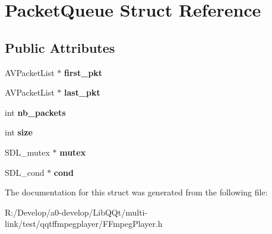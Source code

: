 \hypertarget{struct_packet_queue}{}\section{Packet\+Queue Struct Reference}
\label{struct_packet_queue}
\subsection*{Public Attributes}
\begin{DoxyCompactItemize}
\item 
\mbox{\label{struct_packet_queue_a0c0ecde589c90c7fa622a8a6e7986fe0}} 
A\+V\+Packet\+List $\ast$ {\bfseries first\+\_\+pkt}
\item 
\mbox{\label{struct_packet_queue_a4f69e7bcc9f396eb8905b838fa998e28}} 
A\+V\+Packet\+List $\ast$ {\bfseries last\+\_\+pkt}
\item 
\mbox{\label{struct_packet_queue_af3c07e48d198caafc282a7913dcfc28c}} 
int {\bfseries nb\+\_\+packets}
\item 
\mbox{\label{struct_packet_queue_ab425eb21a546a872c1cab40422b3cf71}} 
int {\bfseries size}
\item 
\mbox{\label{struct_packet_queue_a4a26c3f837f525a42951b5e7c69b977d}} 
S\+D\+L\+\_\+mutex $\ast$ {\bfseries mutex}
\item 
\mbox{\label{struct_packet_queue_a8e900098f927e7052d7304438a1bdeea}} 
S\+D\+L\+\_\+cond $\ast$ {\bfseries cond}
\end{DoxyCompactItemize}


The documentation for this struct was generated from the following file\+:\begin{DoxyCompactItemize}
\item 
R\+:/\+Develop/a0-\/develop/\+Lib\+Q\+Qt/multi-\/link/test/qqtffmpegplayer/F\+Fmpeg\+Player.\+h\end{DoxyCompactItemize}
